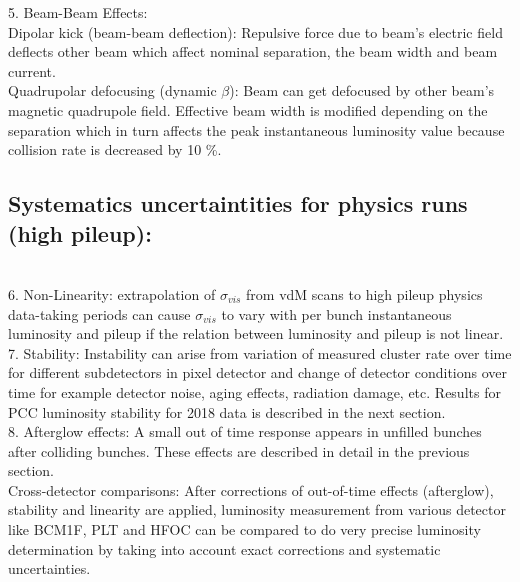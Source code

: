 5. Beam-Beam Effects: \\

Dipolar kick (beam-beam deflection): Repulsive force due to beam's electric field deflects other beam which affect nominal separation, the beam width and beam current. \\
Quadrupolar defocusing (dynamic $\beta$): Beam can get defocused by other beam's magnetic quadrupole field. Effective beam width is modified depending on the separation which in turn affects the peak instantaneous luminosity value because collision rate is decreased by 10 \%. \\

\subsection{Systematics uncertaintities for physics runs (high pileup):}\\

6. Non-Linearity: extrapolation of $\sigma_{vis}$ from vdM scans to high pileup physics data-taking periods can cause $\sigma_{vis}$ to vary with per bunch instantaneous luminosity and pileup if the relation between luminosity and pileup is not linear.                               \\

7. Stability: Instability can arise from variation of measured cluster rate over time for different subdetectors in pixel detector and change of detector conditions over time for example detector noise, aging effects, radiation damage, etc. Results for PCC luminosity stability for 2018 data is described in the next section.                               \\

8. Afterglow effects: A small out of time response appears in unfilled bunches after colliding bunches. These effects are described in detail in the previous section. \\


Cross-detector comparisons: After corrections of out-of-time effects (afterglow), stability and linearity are applied, luminosity measurement from various detector like BCM1F, PLT and HFOC can be compared to do very precise luminosity determination by taking into account exact corrections and systematic uncertainties\cite{CMS-PAS-LUM-18-002}. 



